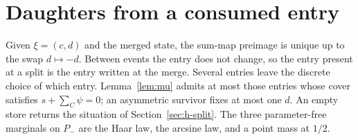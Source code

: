 \section{Daughters from a consumed entry}
\label{sec:h-daughters}

Given \(\xi=(c,d)\) and the merged state, the sum-map preimage is unique up
to the swap \(d\mapsto -d\).
Between events the entry does not change, so the entry present at a split is
the entry written at the merge.
Several entries leave the discrete choice of which entry.
Lemma~\ref{lem:mu} admits at most those entries whose cover satisfies
\(s+\sum_C\psi=0\); an asymmetric survivor fixes at most one \(d\).
An empty store returns the situation of Section~\ref{sec:h-split}.
The three parameter-free marginals on \(P_-\) are the Haar law, the arcsine
law, and a point mass at \(1/2\).
